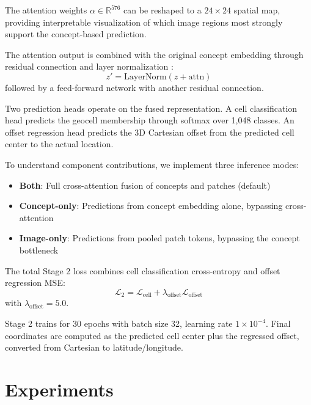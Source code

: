\documentclass{uva-inf-article}
\begin{document}
The attention weights $\alpha \in \mathbb{R}^{576}$ can be reshaped to a $24 \times 24$ spatial map, providing interpretable visualization of which image regions most strongly support the concept-based prediction.

The attention output is combined with the original concept embedding through residual connection and layer normalization \parencite{ba2016layer}:
\begin{equation}
z' = \text{LayerNorm}(z + \text{attn})
\end{equation}
followed by a feed-forward network with another residual connection.

Two prediction heads operate on the fused representation. A cell classification head predicts the geocell membership through softmax over 1,048 classes. An offset regression head predicts the 3D Cartesian offset from the predicted cell center to the actual location.

To understand component contributions, we implement three inference modes:
\begin{itemize}
    \item \textbf{Both}: Full cross-attention fusion of concepts and patches (default)
    \item \textbf{Concept-only}: Predictions from concept embedding alone, bypassing cross-attention
    \item \textbf{Image-only}: Predictions from pooled patch tokens, bypassing the concept bottleneck
\end{itemize}

The total Stage 2 loss combines cell classification cross-entropy and offset regression MSE:
\begin{equation}
\mathcal{L}_2 = \mathcal{L}_{\text{cell}} + \lambda_{\text{offset}}\mathcal{L}_{\text{offset}}
\end{equation}
with $\lambda_{\text{offset}} = 5.0$.

Stage 2 trains for 30 epochs with batch size 32, learning rate $1 \times 10^{-4}$. Final coordinates are computed as the predicted cell center plus the regressed offset, converted from Cartesian to latitude/longitude.


\section{Experiments}
\label{sec:experiments}
\end{document}
